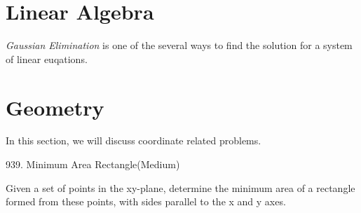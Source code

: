 \documentclass[../main.tex]{subfiles}
\begin{document}
\section{Linear Algebra}
\textit{Gaussian Elimination} is one of the several ways to find the solution for a system of linear euqations. 

\section{Geometry}
In this section, we will discuss coordinate related problems. 

939. Minimum Area Rectangle(Medium)

Given a set of points in the xy-plane, determine the minimum area of a rectangle formed from these points, with sides parallel to the x and y axes.
\end{document}
